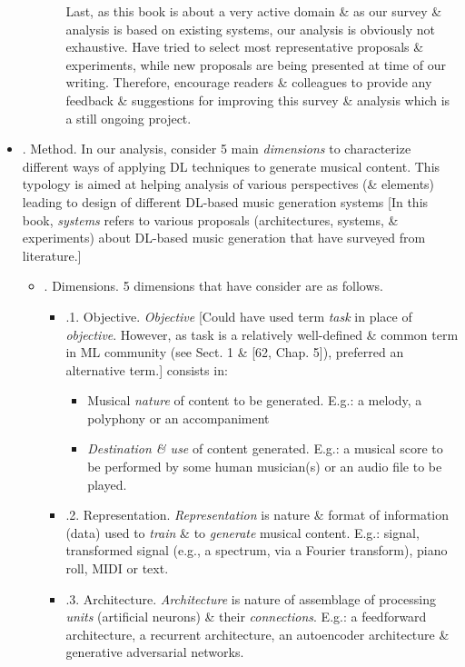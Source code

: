 \documentclass{article}
\begin{document}
\begin{itemize}
\begin{itemize}
\begin{itemize}
			Last, as this book is about a very active domain \& as our survey \& analysis is based on existing systems, our analysis is obviously not exhaustive. Have tried to select most representative proposals \& experiments, while new proposals are being presented at time of our writing. Therefore, encourage readers \& colleagues to provide any feedback \& suggestions for improving this survey \& analysis which is a still ongoing project.
		\end{itemize}
	\end{itemize}
	\item {. Method.} In our analysis, consider 5 main {\it dimensions} to characterize different ways of applying DL techniques to generate musical content. This typology is aimed at helping analysis of various perspectives (\& elements) leading to design of different DL-based music generation systems [In this book, {\it systems} refers to various proposals (architectures, systems, \& experiments) about DL-based music generation that have surveyed from literature.]
	\begin{itemize}
		\item {. Dimensions.} 5 dimensions that have consider are as follows.
		\begin{itemize}
			\item {.1. Objective.} {\it Objective} [Could have used term {\it task} in place of {\it objective}. However, as task is a relatively well-defined \& common term in ML community (see Sect. 1 \& [62, Chap. 5]), preferred an alternative term.] consists in:
			\begin{itemize}
				\item Musical {\it nature} of content to be generated. E.g.: a melody, a polyphony or an accompaniment
				\item {\it Destination \& use} of content generated. E.g.: a musical score to be performed by some human musician(s) or an audio file to be played.
			\end{itemize}
			\item {.2. Representation.} {\it Representation} is nature \& format of information (data) used to {\it train} \& to {\it generate} musical content. E.g.: signal, transformed signal (e.g., a spectrum, via a Fourier transform), piano roll, MIDI or text.
			\item {.3. Architecture.} {\it Architecture} is nature of assemblage of processing {\it units} (artificial neurons) \& their {\it connections}. E.g.: a feedforward architecture, a recurrent architecture, an autoencoder architecture \& generative adversarial networks.


\end{itemize}
\end{itemize}
\end{itemize}
\end{document}
